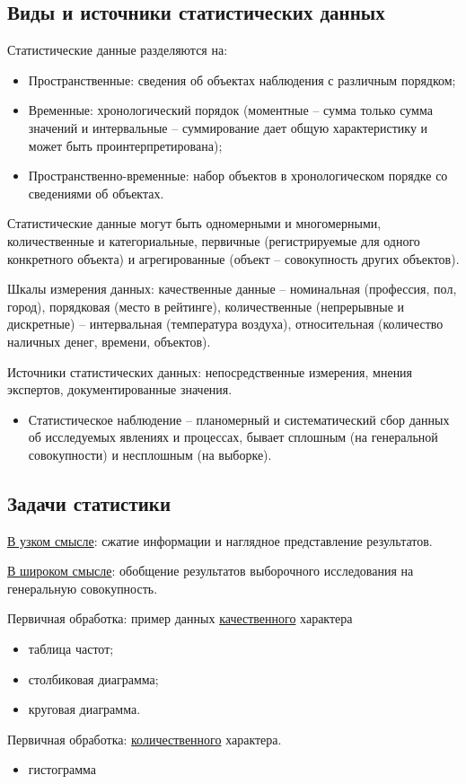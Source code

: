     \subsection*{Виды и источники статистических данных}
    Статистические данные разделяются на:
    \begin{itemize}
        \item Пространственные: сведения об объектах наблюдения с различным порядком;
        \item Временные: хронологический порядок (моментные -- сумма только сумма значений и интервальные -- суммирование дает общую характеристику и может быть проинтерпретирована);
        \item Пространственно-временные: набор объектов в хронологическом порядке со сведениями об объектах. 
    \end{itemize}
    Статистические данные могут быть одномерными и многомерными, количественные и категориальные, первичные (регистрируемые для одного конкретного объекта) и агрегированные (объект -- совокупность других объектов). 
    \par 
    Шкалы измерения данных: качественные данные -- номинальная (профессия, пол, город), порядковая (место в рейтинге), количественные (непрерывные и дискретные) -- интервальная (температура воздуха), относительная (количество наличных денег, времени, объектов).
    \par 
    Источники статистических данных: непосредственные измерения, мнения экспертов, документированные значения.
    \begin{itemize}
        \item Статистическое наблюдение -- планомерный и систематический сбор данных об исследуемых явлениях и процессах, бывает сплошным (на генеральной совокупности) и несплошным (на выборке).
    \end{itemize}
    \subsection*{Задачи статистики}
    \underline{В узком смысле}: сжатие информации и наглядное представление результатов.
    \par
    \underline{В широком смысле}: обобщение результатов выборочного исследования на генеральную совокупность.
    \par
    Первичная обработка: пример данных \underline{качественного} характера
    \begin{itemize}
        \item таблица частот;
        \item столбиковая диаграмма;
        \item круговая диаграмма.
    \end{itemize}
    Первичная обработка: \underline{количественного} характера. \begin{itemize}
        \item гистограмма
    \end{itemize}
